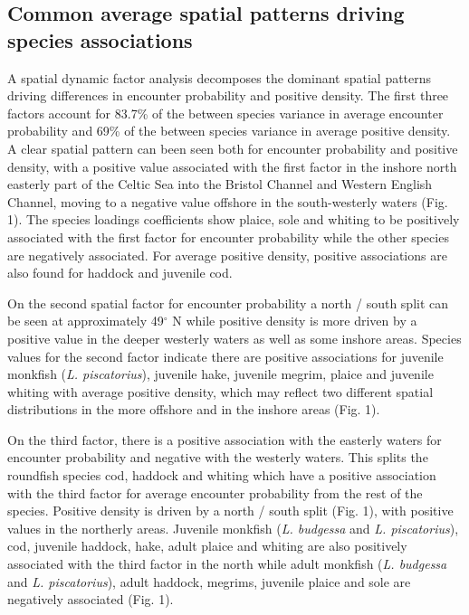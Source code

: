 \documentclass{nature}
\begin{document}
\begin{linenumbers}

\subsection{Common average spatial patterns driving species associations} A
spatial dynamic factor analysis decomposes the dominant spatial patterns
driving differences in encounter probability and positive density. The first
three factors account for 83.7\% of the between
species variance in average encounter probability and 69\% of the between
species variance in average positive density. A clear spatial pattern can been
seen both for encounter probability and positive density, with a positive value
associated with the first factor in the inshore north easterly part of the
Celtic Sea into the Bristol Channel and Western English Channel, moving to a
negative value offshore in the south-westerly waters (Fig. 1).  The species
loadings coefficients show plaice, sole and whiting to be positively associated
with the first factor for encounter probability while the other species are
negatively associated. For average positive density, positive associations are
also found for haddock and juvenile cod.  

On the second spatial factor for encounter probability a north / south split
can be seen at approximately 49$^{\circ}$ N while positive density is more
driven by a positive value in the deeper westerly waters as well as some
inshore areas. Species values for the second factor indicate there are positive
associations for juvenile monkfish (\emph{L. piscatorius}), juvenile hake,
juvenile megrim, plaice and juvenile whiting with average positive density,
which may reflect two different spatial distributions in the more offshore and
in the inshore areas (Fig. 1).

On the third factor, there is a positive association with the easterly waters
for encounter probability and negative with the westerly waters. This
 splits the
roundfish species cod, haddock and whiting which have a positive
association with the third factor for average encounter probability from the
rest of the species.  Positive
density is driven by a north / south split (Fig. 1), with positive values in
the northerly areas. Juvenile monkfish (\emph{L.  budgessa} and \emph{L.
	piscatorius}), cod, juvenile haddock, hake, adult plaice and whiting
are also positively associated with the third factor in the north while adult
monkfish (\emph{L. budgessa} and \emph{L.  piscatorius}), adult haddock,
megrims, juvenile plaice and sole are negatively associated  (Fig. 1).


\end{linenumbers}
\end{document}
